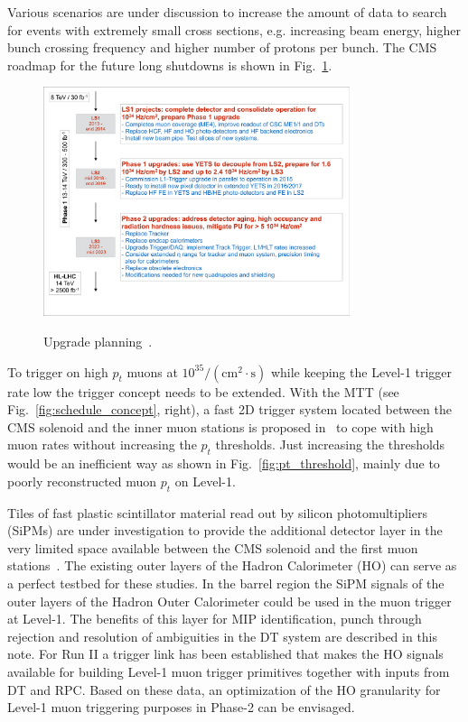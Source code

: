 Various scenarios are under discussion to increase the amount of data to search for events with extremely small cross sections, e.g. increasing beam energy, higher bunch 
crossing frequency and higher number of protons per bunch. The CMS roadmap for the future long shutdowns is shown in Fig.~\ref{fig:upgrade_planning}.
\begin{figure}[htbp]
\centering
\includegraphics[width=0.8\textwidth]{Figures/pooth/upgrade_planning.pdf}\\
\caption{Upgrade planning~\cite{upgrade_planning}.} 
\label{fig:upgrade_planning}
\end{figure}

To trigger on high $p_t$ muons at $10^{35}/(\mathrm{cm}^2 \cdot\mathrm{s})$ while keeping the Level-1 trigger rate low the trigger concept needs to be extended. With the MTT (see 
Fig.~\ref{fig:schedule_concept}, right), a fast 2D trigger system located between the CMS solenoid and the inner muon stations is proposed in~\cite{mtt_concept} to cope with high 
muon rates without increasing the $p_t$ thresholds. Just increasing the thresholds would be an inefficient way as shown in Fig.~\ref{fig:pt_threshold}, mainly due to poorly 
reconstructed muon $p_t$ on Level-1.

Tiles of fast plastic scintillator material read out by silicon photomultipliers (SiPMs) are under investigation to provide the additional detector layer in the very limited space available 
between the CMS solenoid and the first muon stations~\cite{dn2014-020}. The existing outer layers of the Hadron Calorimeter (HO)  can serve as a perfect testbed for these studies. In the barrel region the 
SiPM signals of the outer layers of the Hadron Outer Calorimeter could be used in the muon trigger at Level-1. The benefits of this layer for MIP identification, punch through rejection 
and resolution of ambiguities in the DT system are described in this note. For Run II a trigger link has been established that makes the HO signals available for building Level-1 muon 
trigger primitives together with inputs from DT and RPC. Based on these data, an optimization of the HO granularity for Level-1 muon triggering purposes in Phase-2 can be envisaged.

